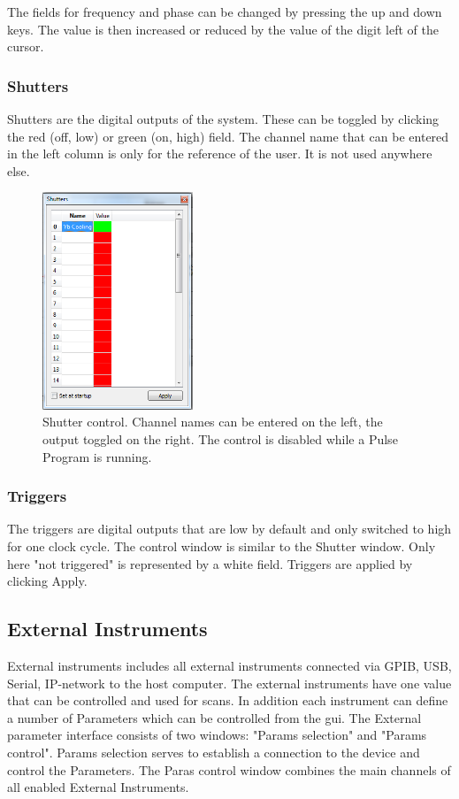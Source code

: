 \documentclass[11pt]{scrartcl}
\begin{document}
The fields for frequency and phase can be changed by pressing the up and down keys. The value is then increased or reduced by the value of the digit left of the cursor.

\subsubsection{Shutters}
Shutters are the digital outputs of the system. These can be toggled by clicking the red (off, low) or green (on, high) field. The channel name that can be entered in the left column is only for the reference of the user. It is not used anywhere else.

\begin{figure}
\centering
\includegraphics[width=0.4\textwidth]{Shutters}
\caption{\label{Shutters} Shutter control. Channel names can be entered on the left, the output toggled on the right. The control is disabled while a Pulse Program is running.}
\end{figure}

\subsubsection{Triggers}
The triggers are digital outputs that are low by default and only switched to high for one clock cycle. The control window is similar to the Shutter window. Only here "not triggered" is represented by a white field. Triggers are applied by clicking Apply.

\subsection{External Instruments}
External instruments includes all external instruments connected via GPIB, USB, Serial, IP-network to the host computer. The external instruments have one value that can be controlled and used for scans. In addition each instrument can define a number of Parameters which can be controlled from the gui. The External parameter interface consists of two windows: "Params selection" and "Params control". Params selection serves to establish a connection to the device and control the Parameters. The Paras control window combines the main channels of all enabled External Instruments.
\end{document}
